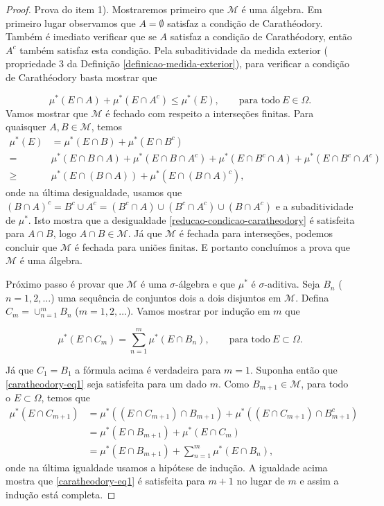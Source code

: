 \begin{proof}
Prova do item 1). Mostraremos primeiro que $\mathcal{M}$ é uma álgebra.
Em primeiro lugar observamos que $A=\emptyset$ satisfaz 
a condição de Carathéodory. Também é imediato verificar que se $A$ 
satisfaz a condição de Carathéodory, então $A^c$ também satisfaz esta condição. 
Pela subaditividade da medida exterior ( propriedade 3 da Definição \ref{definicao-medida-exterior}), 
para verificar a condição de Carathéodory basta mostrar que 

\begin{equation}\label{reducao-condicao-caratheodory}
\mu^*(E\cap A)+\mu^*(E\cap A^c)\leq \mu^*(E),
\qquad
\text{para todo}\ E\in\Omega.
\end{equation}
Vamos mostrar que $\mathcal{M}$ é fechado com respeito a interseções finitas. 
Para quaisquer $A,B\in\mathcal{M}$, temos
\begin{align*}
\mu^*(E) &= \mu^*(E\cap B) + \mu^*(E\cap B^c) \qquad 
\\
=& \mu^*(E\cap B\cap A)+\mu^*(E\cap B\cap A^c) + \mu^*(E\cap B^c\cap A)+ \mu^*(E\cap B^c\cap A^c)
\\
\geq & \mu^*(E\cap(B\cap A))+\mu^*(E\cap(B\cap A)^c),
\end{align*}
onde na última desigualdade, usamos que 
$(B\cap A)^c=B^c\cup A^c = (B^c\cap A) \cup (B^c\cap A^c) \cup (B\cap A^c)$
e a subaditividade de $\mu^*$. Isto mostra que a desigualdade 
\eqref{reducao-condicao-caratheodory} é satisfeita para $A\cap B$, logo 
$A\cap B\in \mathcal{M}$. Já que $\mathcal{M}$ é fechada para interseções,
podemos concluir que $\mathcal{M}$ é fechada para uniões finitas.
E portanto concluímos a prova que $\mathcal{M}$ é uma álgebra.

Próximo passo é provar que $\mathcal{M}$ é uma $\sigma$-álgebra e
que $\mu^*$ é $\sigma$-aditiva. 
Seja $B_n$ ($n=1,2,\ldots$) uma sequência de conjuntos dois a 
dois disjuntos em $\mathcal{M}$. 
Defina $C_m = \cup_{n=1}^m B_n$ ($m=1,2,\ldots$).
Vamos mostrar por indução em $m$ que 

\begin{equation} \label{caratheodory-eq1}
    \mu^*(E\cap C_m) = \sum_{n=1}^m \mu^*(E\cap B_n), 
    \qquad \text{para todo} \ E\subset\Omega.
\end{equation}

Já que $C_1=B_1$ a fórmula acima é verdadeira para $m=1$. Suponha então que 
\eqref{caratheodory-eq1} seja satisfeita para um dado $m$. Como $B_{m+1} \in  \mathcal{M}$,
para todo o $ E \subset \Omega $, temos que
\begin{align*}
    \mu^*(E \cap C_{m+1}) & = \mu^*((E \cap C_{m+1})\cap B_{m+1}) + 
    \mu^*((E \cap C_{m+1})\cap B^c_{m+1})\\
    & = \mu^*(E \cap B_{m+1}) + \mu^*(E\cap C_{m})\\
    & = \mu^*(E \cap B_{m+1}) + \sum_{n=1}^m \mu^*(E\cap B_n),
\end{align*}
onde na última igualdade usamos a hipótese de indução. 
A igualdade acima mostra que \eqref{caratheodory-eq1} 
é satisfeita para $m+1$ no lugar de $m$ e assim a indução está completa. 



\end{proof}
